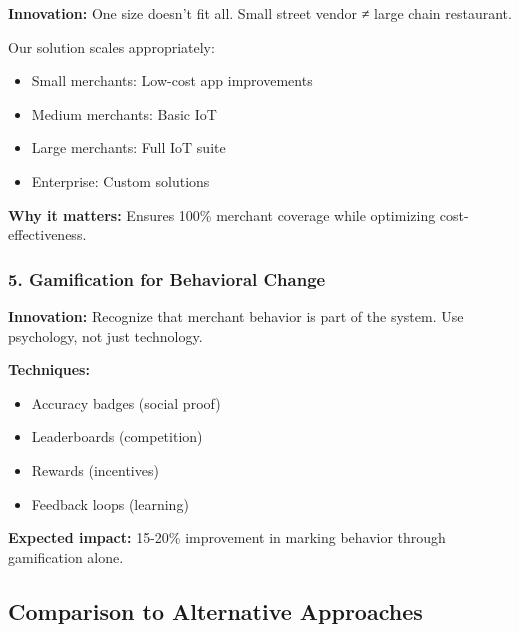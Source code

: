 \documentclass[11pt,a4paper]{article}
\begin{document}
\textbf{Innovation:} One size doesn't fit all. Small street vendor ≠ large chain restaurant.

Our solution scales appropriately:
\begin{itemize}
    \item Small merchants: Low-cost app improvements
    \item Medium merchants: Basic IoT
    \item Large merchants: Full IoT suite
    \item Enterprise: Custom solutions
\end{itemize}

\textbf{Why it matters:} Ensures 100\% merchant coverage while optimizing cost-effectiveness.

\subsubsection{5. Gamification for Behavioral Change}

\textbf{Innovation:} Recognize that merchant behavior is part of the system. Use psychology, not just technology.

\textbf{Techniques:}
\begin{itemize}
    \item Accuracy badges (social proof)
    \item Leaderboards (competition)
    \item Rewards (incentives)
    \item Feedback loops (learning)
\end{itemize}

\textbf{Expected impact:} 15-20\% improvement in marking behavior through gamification alone.

\subsection{Comparison to Alternative Approaches}
\end{document}
